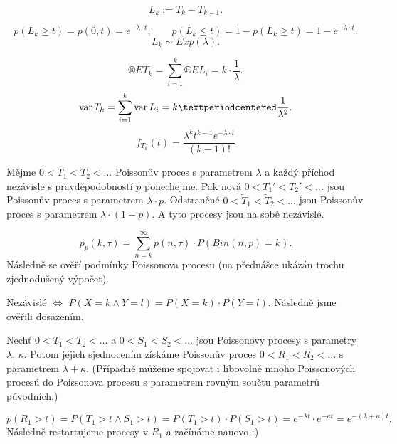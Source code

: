 \documentclass[12pt]{article}					%
\begin{document}
\begin{definice}
	$$ L_k := T_k - T_{k-1}. $$
\end{definice}

\begin{dusledek}
	$$ p(L_k ≥ t) = p(0, t) = e^{-\lambda·t}, \qquad p(L_k ≤ t) = 1 - p(L_k ≥ t) = 1 - e^{-\lambda·t}. $$
	$$ L_k \sim Exp(\lambda). $$
\end{dusledek}

\begin{dusledek}
	$$ ®E T_k = \sum_{i = 1}^k ®E L_i = k·\frac{1}{\lambda}. $$
	$$ \var T_k = \sum_{i=1}^k \var L_i = k·\frac{1}{\lambda^2}. $$
	$$ f_{T_k}(t) = \frac{\lambda^k t^{k-1} e^{-\lambda·t}}{(k-1)!} $$
\end{dusledek}

\begin{veta}
	Mějme $0 < T_1 < T_2 < …$ Poissonův proces s parametrem $\lambda$ a každý příchod nezávisle s pravděpodobností $p$ ponechejme. Pak nová $0 < T_1' < T_2' < …$ jsou Poissonův proces s parametrem $\lambda·p$. Odstraněné $0 < \tilde T_1 < \tilde T_2 < …$ jsou Poissonův proces s parametrem $\lambda·(1 - p)$. A tyto procesy jsou na sobě nezávislé.

	\begin{dukazin}
		$$ p_p(k, \tau) = \sum_{n=k}^∞ p(n, \tau)·P(Bin(n, p) = k). $$
		Následně se ověří podmínky Poissonova procesu (na přednášce ukázán trochu zjednodušený výpočet).

		Nezávislé $\Leftrightarrow$ $P(X = k \land Y = l) = P(X = k)·P(Y = l)$. Následně jsme ověřili dosazením.
	\end{dukazin}
\end{veta}

\begin{veta}
	Nechť $0 < T_1 < T_2 < …$ a $0 < S_1 < S_2 < …$ jsou Poissonovy procesy s parametry $\lambda$, $\kappa$. Potom jejich sjednocením získáme Poissonův proces $0 < R_1 < R_2 < …$ s parametrem $\lambda + \kappa$. (Případně můžeme spojovat i libovolně mnoho Poissonových procesů do Poissonova procesu s parametrem rovným součtu parametrů původních.)

	\begin{dukazin}
		$$ p(R_1 > t) = P(T_1 > t \land S_1 > t) = P(T_1 > t)·P(S_1 > t) = e^{-\lambda t}·e^{-\kappa t} = e^{-(\lambda + \kappa) t}. $$
		Následně restartujeme procesy v $R_1$ a začínáme nanovo :)
	\end{dukazin}
\end{veta}
\end{document}
